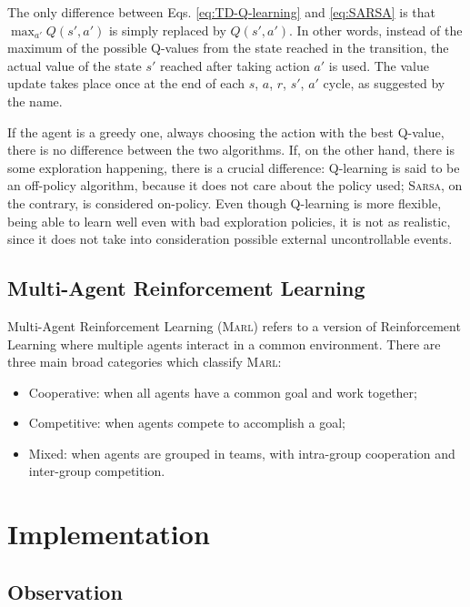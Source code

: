 \documentclass[a4paper, 12pt]{article}
\numberwithin{equation}{section}
\begin{document}
The only difference between Eqs. \eqref{eq:TD-Q-learning} and \eqref{eq:SARSA} is that $\max_{a'}Q\left(s',a'\right)$ is simply replaced by $Q\left(s',a'\right)$. In other words, instead of the maximum of the possible Q-values from the state reached in the transition, the actual value of the state $s'$ reached after taking action $a'$ is used. The value update takes place once at the end of each $s$, $a$, $r$, $s'$, $a'$ cycle, as suggested by the name.

If the agent is a greedy one, always choosing the action with the best Q-value, there is no difference between the two algorithms. If, on the other hand, there is some exploration happening, there is a crucial difference: Q-learning is said to be an off-policy algorithm, because it does not care about the policy used; \textsc{Sarsa}, on the contrary, is considered on-policy. Even though Q-learning is more flexible, being able to learn well even with bad exploration policies, it is not as realistic, since it does not take into consideration possible external uncontrollable events.

\subsection[Multi-Agent Reinforcement Learning]{Multi-Agent Reinforcement Learning \cite{multi-agent-rl}}

Multi-Agent Reinforcement Learning (\textsc{Marl}) refers to a version of Reinforcement Learning where multiple agents interact in a common environment. There are three main broad categories which classify \textsc{Marl}:
\begin{itemize}
	\item Cooperative: when all agents have a common goal and work together;
	\item Competitive: when agents compete to accomplish a goal;
	\item Mixed: when agents are grouped in teams, with intra-group cooperation and inter-group competition.
\end{itemize}



\section{Implementation}


\subsection{Observation}
\end{document}
